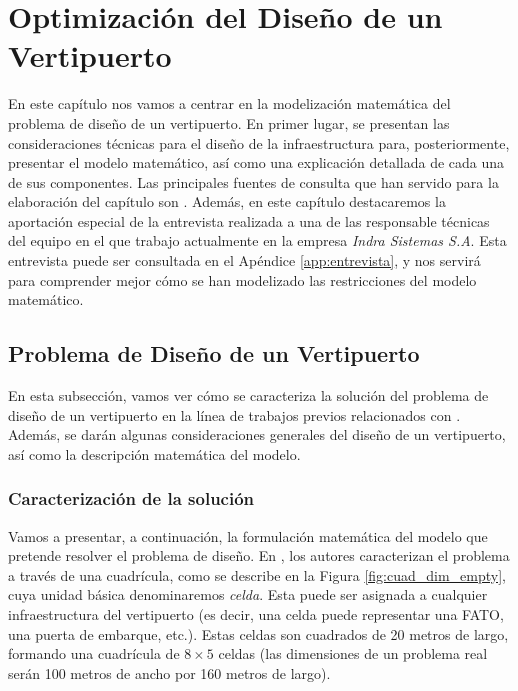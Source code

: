 \documentclass[12pt,a4paper]{book}
\begin{document}
\chapter{Optimización del Diseño de un Vertipuerto} \label{Capitulo_3}
En este capítulo nos vamos a centrar en la modelización matemática del problema de diseño de un vertipuerto. En primer lugar, se presentan las consideraciones técnicas para el diseño de la infraestructura para, posteriormente, presentar el modelo matemático, así como una explicación detallada de cada una de sus componentes. Las principales fuentes de consulta que han servido para la elaboración del capítulo son \cite{easa_vertiports_2022, federal_aviation_administration_vertiport_2022, park_vertiport_2022}. Además, en este capítulo destacaremos la aportación especial de la entrevista realizada a una de las responsable técnicas del equipo en el que trabajo actualmente en la empresa \textsl{Indra Sistemas S.A}. Esta entrevista puede ser consultada en el Apéndice \ref{app:entrevista}, y nos servirá para comprender mejor cómo se han modelizado las restricciones del modelo matemático.    

\section{Problema de Diseño de un Vertipuerto}
En esta subsección, vamos ver cómo se caracteriza la solución del problema de diseño de un vertipuerto en la línea de trabajos previos relacionados con \cite{park_vertiport_2022}. Además, se darán algunas consideraciones generales del diseño de un vertipuerto, así como la descripción matemática del modelo. 

\subsection{Caracterización de la solución}
Vamos a presentar, a continuación, la formulación matemática del modelo que pretende resolver el problema de 
diseño. En \cite{park_vertiport_2022}, los autores caracterizan el problema a través de una cuadrícula, como se describe en la Figura \ref{fig:cuad_dim_empty}, cuya unidad básica denominaremos \textsl{celda}. Esta puede ser asignada a cualquier infraestructura del vertipuerto (es decir, una celda puede representar una FATO, una puerta de embarque, etc.). Estas celdas son cuadrados de 20 metros de largo, formando una cuadrícula de $8 \times 5$ celdas (las dimensiones de un problema real serán 100 metros de ancho por 160 metros de largo). 
\end{document}
